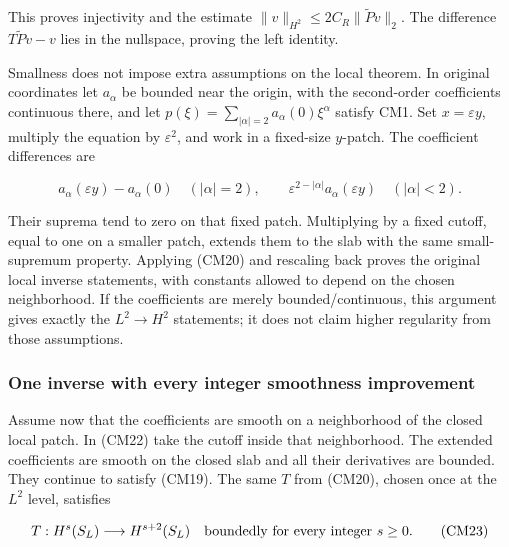 \documentclass[
  11pt,
]{article}
\makeatletter
\let\ReaderOriginalAnchorStart\hyper@anchorstart
\let\ReaderOriginalAnchorEnd\hyper@anchorend
\let\ReaderPendingAliases\@empty
\def\ReaderArmAliases#1{\gdef\ReaderPendingAliases{#1}}
\def\hyper@anchorstart#1{\ReaderIfNativeAnchorTF{#1}{\ReaderPendingAliases\global\let\ReaderPendingAliases\@empty}{}\ReaderOriginalAnchorStart{#1}}
\makeatother
\begin{document}
This proves injectivity and the estimate
\(\|v\|_{H^2}\leq2C_R\|\widetilde Pv\|_2\). The difference
\(T\widetilde Pv-v\) lies in the nullspace, proving the left identity.

Smallness does not impose extra assumptions on the local theorem. In
original coordinates let \(a_\alpha\) be bounded near the origin, with
the second-order coefficients continuous there, and let
\(p(\xi)=\sum_{|\alpha|=2}a_\alpha(0)\xi^\alpha\) satisfy CM1. Set
\(x=\varepsilon y\), multiply the equation by \(\varepsilon^2\), and
work in a fixed-size \(y\)-patch. The coefficient differences are

\[
a_\alpha(\varepsilon y)-a_\alpha(0)\quad(|\alpha|=2),
\qquad \varepsilon^{2-|\alpha|}a_\alpha(\varepsilon y)\quad(|\alpha|<2).
\tag{CM22}
\]

Their suprema tend to zero on that fixed patch. Multiplying by a fixed
cutoff, equal to one on a smaller patch, extends them to the slab with
the same small-supremum property. Applying (CM20) and rescaling back
proves the original local inverse statements, with constants allowed to
depend on the chosen neighborhood. If the coefficients are merely
bounded/continuous, this argument gives exactly the \(L^2\to H^2\)
statements; it does not claim higher regularity from those assumptions.

\ReaderArmAliases{\ReaderOriginalAnchorStart{cm5-one-inverse-with-every-integer-smoothness-improvement}\ReaderOriginalAnchorEnd\begingroup\expandafter\def\csname @currentHref\endcsname{cm5-one-inverse-with-every-integer-smoothness-improvement}\label{cm5-one-inverse-with-every-integer-smoothness-improvement}\endgroup\ReaderOriginalAnchorStart{one-inverse-with-every-integer-smoothness-improvement}\ReaderOriginalAnchorEnd}
\subsubsection{One inverse with every integer smoothness
improvement}\label{one-inverse-with-every-integer-smoothness-improvement}

Assume now that the coefficients are smooth on a neighborhood of the
closed local patch. In (CM22) take the cutoff inside that neighborhood.
The extended coefficients are smooth on the closed slab and all their
derivatives are bounded. They continue to satisfy (CM19). The same \(T\)
from (CM20), chosen once at the \(L^2\) level, satisfies

\[
T:H^s(S_L)\longrightarrow H^{s+2}(S_L)
\quad\hbox{boundedly for every integer }s\geq0.
\tag{CM23}
\]
\end{document}
